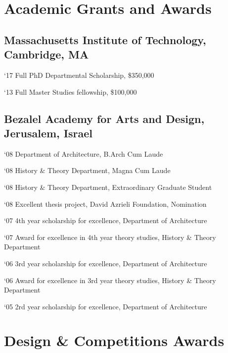 \section*{Academic Grants and Awards}

\subsection*{Massachusetts Institute of Technology, Cambridge, MA}
\begin{tablist}
	\item[`17] \tab Full PhD Departmental Scholarship, \$350,000
	\item[`13] \tab Full Master Studies fellowship, \$100,000
\end{tablist}
    
\subsection*{Bezalel Academy for Arts and Design, Jerusalem, Israel}
\begin{tablist}
	\item[`08] \tab Department of Architecture, B.Arch Cum Laude
	\item[`08] \tab History \& Theory Department, Magna Cum Laude
	\item[`08] \tab History \& Theory Department, Extraordinary Graduate Student
	\item[`08] \tab Excellent thesis project, David Azrieli Foundation, Nomination 
	\item[`07] \tab 4th year scholarship for excellence, Department of Architecture \item[`07]\tab  Award for excellence in 4th year theory studies, History \& Theory Department 
	\item[`06]\tab  3rd year scholarship for excellence, Department of Architecture \item[`06]\tab  Award for excellence in 3rd year theory studies, History \& Theory Department
	\item[`05]\tab  2rd year scholarship for excellence, Department of Architecture
	       
\end{tablist}
    
\section*{Design \& Competitions Awards}

